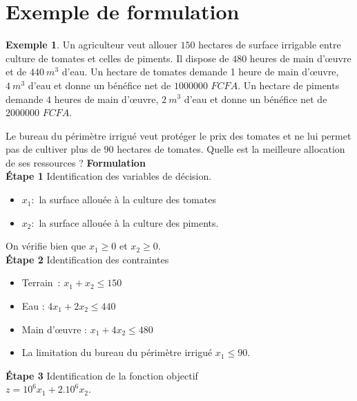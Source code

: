 \documentclass[a4paper,12pt,openany]{book}
\theoremstyle{plain}
\theoremstyle{definition}
\newtheorem{exemple}[theorem]{Exemple}
\theoremstyle{remark}
\theoremstyle{nbstyle}
\begin{document}
	\section{Exemple de formulation}
	\begin{exemple}
		Un agriculteur veut allouer $ 150 $ hectares de surface irrigable entre culture de tomates et celles de piments. Il dispose de $ 480 $ heures de main d’œuvre et de $ 440 \:m^{3}$ d’eau. Un hectare de tomates demande 1 heure de main d’œuvre, $ 4 \:m^{3}$ d’eau et donne un bénéfice net de $ 1000000 $ $ FCFA $. Un hectare de piments demande $ 4 $ heures de main d’œuvre, $ 2 \:m^{3}$ d’eau et donne un bénéfice net de $ 2000000 $ $ FCFA $.
		
		Le bureau du périmètre irrigué veut protéger le prix des tomates et ne lui permet pas de cultiver plus de $ 90 $ hectares de tomates. Quelle est la meilleure allocation de ses ressources ?
		\textbf{Formulation}\\
		
		\textbf{Étape 1} Identification des variables de décision.\\
		\begin{itemize}
			\item[$\diamond $] $ x_{1}:$ la surface allouée à la culture des tomates
			\item[$\diamond $] $ x_{2}: $ la surface allouée à la culture des piments.
		\end{itemize}
		On vérifie bien que $ x_{1}\geq0 $ et $ x_{2}\geq0 $.\\
		
		\textbf{Étape 2} Identification des contraintes\\
		\begin{itemize}
			\item[$ \diamond $] Terrain : $ x_{1}+x_{2}\leq150 $
			\item[$\diamond $] Eau : $ 4x_{1}+2x_{2}\leq440 $
			\item[$\diamond $] Main d'œuvre : $ x_{1}+4x_{2}\leq480 $
			\item[$\diamond $] La limitation du bureau du périmètre irrigué $ x_{1}\leq 90 $.
		\end{itemize}
		\textbf{Étape 3} Identification de la fonction objectif\\
		$ z=10^{6}x_{1}+2.10^{6}x_{2} $.\\
		

\end{exemple}
\end{document}
